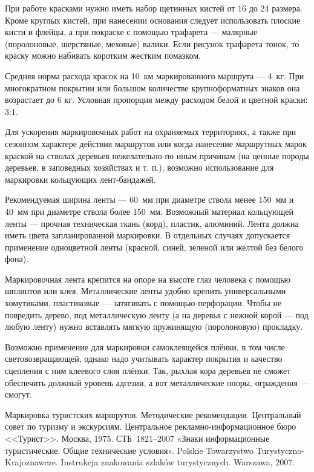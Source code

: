 \documentclass[a4paper,12pt]{extarticle}
\begin{document}
При работе красками нужно иметь набор щетинных кистей от 16 до 24 размера. Кроме круглых кистей, при нанесении основания
следует использовать плоские кисти и флейцы, а при покраске с помощью трафарета --- малярные (поролоновые, шерстяные,
меховые) валики. Если рисунок трафарета тонок, то краску можно набивать коротким жестким помазком.

Средняя норма расхода красок на 10~км маркированного маршрута --- 4~кг. При многократном покрытии или большом количестве
крупноформатных знаков она возрастает до 6 кг. Условная пропорция между расходом белой и цветной краски: 3:1.

Для ускорения маркировочных работ на охраняемых территориях, а также при сезонном характере действия маршрутов или когда
нанесение маршрутных марок краской на стволах деревьев нежелательно по иным причинам (на ценные породы деревьев, в
заповедных хозяйствах и т. п.), возможно использование для маркировки кольцующих лент-бандажей.

Рекомендуемая ширина ленты --- 60~мм при диаметре ствола менее 150~мм и 40~мм при диаметре ствола более 150~мм. Возможный
материал кольцующей ленты --- прочная техническая ткань (корд), пластик, алюминий. Лента должна иметь цвета
запланированной маркировки. В отдельных случаях допускается применение одноцветной ленты (красной, синей, зеленой или
желтой без белого фона).

Маркировочная лента крепится на опоре на высоте глаз человека с помощью шплинтов или клея. Металлические ленты удобно
крепить универсальными хомутиками, пластиковые --- затягивать с помощью перфорации. Чтобы не
повредить дерево, под металлическую ленту (а на деревья с нежной корой --- под любую ленту) нужно вставлять мягкую
пружинящую (поролоновую) прокладку.

Возможно применение для маркировки самоклеящейся плёнки, в том числе световозвращающей, однако надо учитывать характер
покрытия и качество сцепления с ним клеевого слоя плёнки. Так, рыхлая кора деревьев не сможет обеспечить должный
уровень адгезии, а вот металлические опоры, ограждения --- смогут.


\begin{thebibliography}{99}
	 Маркировка туристских маршрутов. Методические рекомендации. Центральный совет по туризму и
		экскурсиям. Центральное рекламно-информационное бюро <<Турист>>. Москва, 1975.
	 СТБ~1821--2007 «Знаки информационные туристические. Общие технические условия».
	 Polskie Towarzystwo Turystyczno-Krajoznawcze. Instrukcja znakowania szlaków turystycznych. Warszawa, 2007.

\end{thebibliography}
\end{document}
